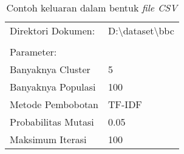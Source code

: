 \begin{table}[H]
\centering
\caption{Contoh keluaran dalam bentuk \textit{file CSV}}
\begin{tabular}{lllll}
Direktori Dokumen:                                 & \multicolumn{4}{l}{D:\textbackslash{}dataset\textbackslash{}bbc} \\
                                                   &                                                                &                                                       &                                                        &                                                       \\
Parameter:                                         &                                                                &                                                       &                                                        &                                                       \\ \cline{1-2}
\multicolumn{1}{|l|}{Banyaknya Cluster}            & \multicolumn{1}{l|}{5}                                         &                                                       &                                                        &                                                       \\ \cline{1-2}
\multicolumn{1}{|l|}{Banyaknya Populasi}           & \multicolumn{1}{l|}{100}                                       &                                                       &                                                        &                                                       \\ \cline{1-2}
\multicolumn{1}{|l|}{Metode Pembobotan}            & \multicolumn{1}{l|}{TF-IDF}                                    &                                                       &                                                        &                                                       \\ \cline{1-2}
\multicolumn{1}{|l|}{Probabilitas Mutasi}          & \multicolumn{1}{l|}{0.05}                                      &                                                       &                                                        &                                                       \\ \cline{1-2}
\multicolumn{1}{|l|}{Maksimum Iterasi}             & \multicolumn{1}{l|}{100}                                       &                                                       &                                                        &                                                       \\ \cline{1-2}

\end{tabular}
\end{table}
